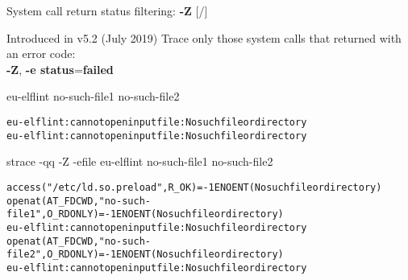 \documentclass[unicode,aspectratio=169]{beamer}
\begin{document}
\begin{frame}[fragile]{System call return status filtering: \textbf{-Z} \hfill [\insertframenumber/\inserttotalframenumber]}
\Large
\begin{block}{Introduced in v5.2 (July 2019)}
Trace only those system calls that returned with an error code: \\
\textbf{-Z}, \textbf{-e status}=\textbf{failed}
\end{block}

\begin{block}{eu-elflint no-such-file1 no-such-file2}
\small
\begin{alltt}
eu-elflint: cannot open input file: No such file or directory
eu-elflint: cannot open input file: No such file or directory
\end{alltt}
\end{block}

\begin{block}{strace -qq -Z -efile eu-elflint no-such-file1 no-such-file2}
\small
\begin{alltt}
access("/etc/ld.so.preload", R_OK) = -1 ENOENT (No such file or directory)
openat(AT_FDCWD, "no-such-file1", O_RDONLY) = -1 ENOENT (No such file or directory)
eu-elflint: cannot open input file: No such file or directory
openat(AT_FDCWD, "no-such-file2", O_RDONLY) = -1 ENOENT (No such file or directory)
eu-elflint: cannot open input file: No such file or directory
\end{alltt}
\end{block}
\end{frame}
\end{document}
